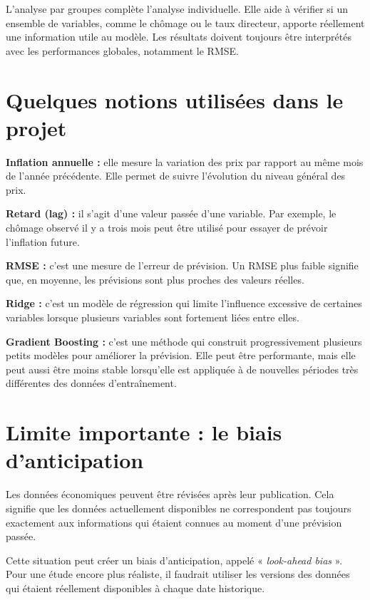 \documentclass[12pt,a4paper]{article}
\begin{document}
L'analyse par groupes complète l'analyse individuelle. Elle aide à vérifier si un ensemble de variables, comme le chômage ou le taux directeur, apporte réellement une information utile au modèle. Les résultats doivent toujours être interprétés avec les performances globales, notamment le RMSE.

\section{Quelques notions utilisées dans le projet}

\textbf{Inflation annuelle :} elle mesure la variation des prix par rapport au même mois de l'année précédente. Elle permet de suivre l'évolution du niveau général des prix.

\textbf{Retard (lag) :} il s'agit d'une valeur passée d'une variable. Par exemple, le chômage observé il y a trois mois peut être utilisé pour essayer de prévoir l'inflation future.

\textbf{RMSE :} c'est une mesure de l'erreur de prévision. Un RMSE plus faible signifie que, en moyenne, les prévisions sont plus proches des valeurs réelles.

\textbf{Ridge :} c'est un modèle de régression qui limite l'influence excessive de certaines variables lorsque plusieurs variables sont fortement liées entre elles.

\textbf{Gradient Boosting :} c'est une méthode qui construit progressivement plusieurs petits modèles pour améliorer la prévision. Elle peut être performante, mais elle peut aussi être moins stable lorsqu'elle est appliquée à de nouvelles périodes très différentes des données d'entraînement.

\section{Limite importante : le biais d'anticipation}

Les données économiques peuvent être révisées après leur publication. Cela signifie que les données actuellement disponibles ne correspondent pas toujours exactement aux informations qui étaient connues au moment d'une prévision passée.

Cette situation peut créer un biais d'anticipation, appelé « \textit{look-ahead bias} ». Pour une étude encore plus réaliste, il faudrait utiliser les versions des données qui étaient réellement disponibles à chaque date historique.
\end{document}
